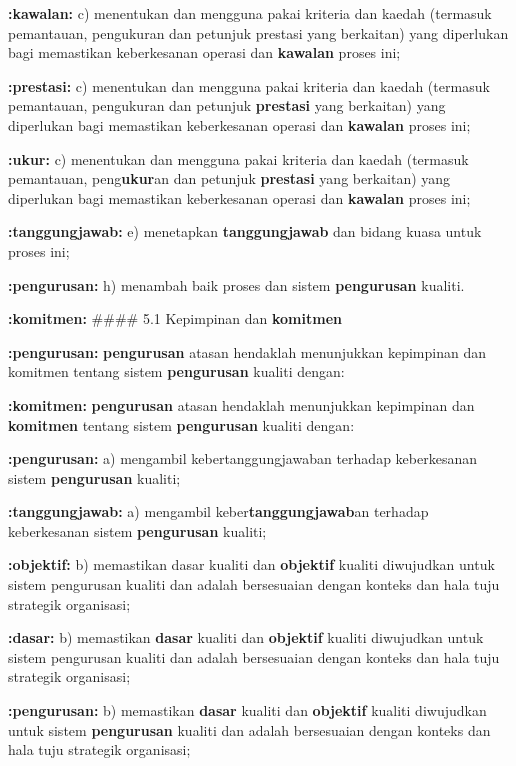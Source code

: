 \documentclass{article}
\begin{document}
\textbf{:kawalan:} c) menentukan dan mengguna pakai kriteria dan kaedah (termasuk pemantauan,
pengukuran dan petunjuk prestasi yang berkaitan) yang diperlukan bagi memastikan
keberkesanan operasi dan \textbf{kawalan} proses ini;

\textbf{:prestasi:} c) menentukan dan mengguna pakai kriteria dan kaedah (termasuk pemantauan,
pengukuran dan petunjuk \textbf{prestasi} yang berkaitan) yang diperlukan bagi memastikan
keberkesanan operasi dan \textbf{kawalan} proses ini;

\textbf{:ukur:} c) menentukan dan mengguna pakai kriteria dan kaedah (termasuk pemantauan,
peng\textbf{ukur}an dan petunjuk \textbf{prestasi} yang berkaitan) yang diperlukan bagi memastikan
keberkesanan operasi dan \textbf{kawalan} proses ini;

\textbf{:tanggungjawab:} e) menetapkan \textbf{tanggungjawab} dan bidang kuasa untuk proses ini;

\textbf{:pengurusan:} h) menambah baik proses dan sistem \textbf{pengurusan} kualiti.

\textbf{:komitmen:} \#\#\#\# 5.1 Kepimpinan dan \textbf{komitmen}

\textbf{:pengurusan:} \textbf{pengurusan} atasan hendaklah menunjukkan kepimpinan dan komitmen tentang sistem
\textbf{pengurusan} kualiti dengan:

\textbf{:komitmen:} \textbf{pengurusan} atasan hendaklah menunjukkan kepimpinan dan \textbf{komitmen} tentang sistem
\textbf{pengurusan} kualiti dengan:

\textbf{:pengurusan:} a) mengambil kebertanggungjawaban terhadap keberkesanan sistem \textbf{pengurusan} kualiti;

\textbf{:tanggungjawab:} a) mengambil keber\textbf{tanggungjawab}an terhadap keberkesanan sistem \textbf{pengurusan} kualiti;

\textbf{:objektif:} b) memastikan dasar kualiti dan \textbf{objektif} kualiti diwujudkan untuk sistem pengurusan kualiti
dan adalah bersesuaian dengan konteks dan hala tuju strategik organisasi;

\textbf{:dasar:} b) memastikan \textbf{dasar} kualiti dan \textbf{objektif} kualiti diwujudkan untuk sistem pengurusan kualiti
dan adalah bersesuaian dengan konteks dan hala tuju strategik organisasi;

\textbf{:pengurusan:} b) memastikan \textbf{dasar} kualiti dan \textbf{objektif} kualiti diwujudkan untuk sistem \textbf{pengurusan} kualiti
dan adalah bersesuaian dengan konteks dan hala tuju strategik organisasi;
\end{document}
